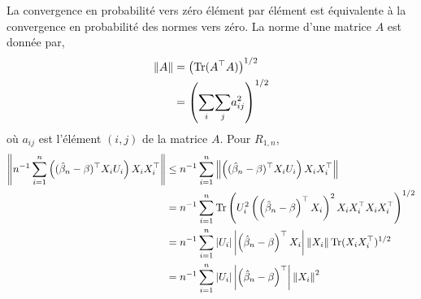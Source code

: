 La convergence en probabilité vers zéro élément par élément est équivalente à la convergence en probabilité des normes vers zéro. La norme d'une matrice $A$ est donnée par,
\begin{align*}
\left\Vert {A} \right\Vert& = \left(\operatorname{Tr}(A^\top A)\right)^{1/2}\\
&= \left(\underset{i}{\sum}\underset{j}{\sum}a_{ij}^2\right)^{1/2}
\end{align*}
où $a_{ij}$ est l'élément $(i, j)$ de la matrice $A$. Pour $R_{1,n}$,
\begin{align*}
\left\Vert {n^{-1}\sum_{i=1}^n\left((\hat{\beta}_n- \beta)^\top X_iU_i\right)X_iX_i^\top} \right\Vert &\leq 
n^{-1} \sum_{i=1}^n \left\Vert {\left((\hat{\beta}_n- \beta)^\top X_iU_i\right)X_iX_i^\top} \right\Vert\\
 &= n^{-1} \sum_{i=1}^n \operatorname{Tr}\left(U_i^2\left(\left(\hat{\beta}_n- \beta\right)^\top X_i\right)^2 X_iX_i^\top X_iX_i^\top\right)^{1/2}\\
 &=n^{-1} \sum_{i=1}^n \left\vert {U_i} \right\vert\left\vert {\left(\hat{\beta}_n- \beta\right)^\top X_i} \right\vert\left\Vert {X_i} \right\Vert\operatorname{Tr}(X_iX_i^\top)^{1/2} \\
 &=n^{-1}\sum_{i=1}^n \left\vert {U_i} \right\vert\left\vert {\left(\hat{\beta}_n- \beta\right)^\top} \right\vert\left\Vert {X_i} \right\Vert^2
\end{align*}

